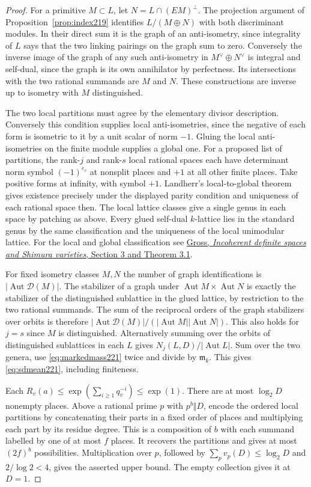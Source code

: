 \documentclass[a4paper,11pt]{article}
\theoremstyle{definition}
\theoremstyle{remark}
\numberwithin{equation}{section}
\newcommand{\Aut}{\operatorname{Aut}}
\begin{document}
\begin{proof}
For a primitive \(M\subset L\), let \(N=L\cap(EM)^\perp\).
The projection argument of Proposition~\ref{prop:index219}
identifies \(L/(M\oplus N)\) with both discriminant modules.
In their direct sum it is the graph of an anti-isometry, since
integrality of \(L\) says that the two linking pairings on
the graph sum to zero. Conversely the inverse image of the
graph of any such anti-isometry in \(M^\vee\oplus N^\vee\)
is integral and self-dual, since the graph is its own
annihilator by perfectness. Its intersections with the two
rational summands are \(M\) and \(N\). These constructions
are inverse up to isometry with \(M\) distinguished.

The two local partitions must agree by the elementary divisor
description. Conversely this condition supplies local
anti-isometries, since the negative of each form is
isometric to it by a unit scalar of norm \(-1\). Gluing the
local anti-isometries on the finite module supplies a global
one. For a proposed list of partitions, the rank-\(j\) and
rank-\(s\) local rational spaces each have determinant norm
symbol \((-1)^{e_v}\) at nonsplit places and \(+1\) at all
other finite places. Take positive forms at infinity, with
symbol \(+1\). Landherr's local-to-global theorem gives
existence precisely under the displayed parity condition
and uniqueness of each rational space then. The local
lattice classes give a single genus in each space by
patching as above. Every glued self-dual \(k\)-lattice lies
in the standard genus by the same classification and the
uniqueness of the local unimodular lattice. For the
local and global classification see
\href{https://people.math.harvard.edu/~gross/preprints/incoherent.pdf}
{Gross, \emph{Incoherent definite spaces and Shimura varieties},
Section 3 and Theorem 3.1}.

For fixed isometry classes \(M,N\) the number of graph
identifications is \(|\Aut\mathcal D(M)|\).
The stabilizer of a graph under \(\Aut M\times\Aut N\)
is exactly the stabilizer of the distinguished sublattice in
the glued lattice, by restriction to the two rational
summands. The sum of the reciprocal orders of the graph
stabilizers over orbits is therefore
\(|\Aut\mathcal D(M)|/(|\Aut M||\Aut N|)\).
This also holds for \(j=s\) since \(M\) is distinguished.
Alternatively summing over the orbits of distinguished
sublattices in each \(L\) gives \(N_j(L,D)/|\Aut L|\).
Sum over the two genera, use \eqref{eq:markedmass221}
twice and divide by \(\mathfrak m_k\). This gives
\eqref{eq:sdmean221}, including finiteness.

Each \(R_v(a)\le\exp(\sum_{i\ge1}q_v^{-i})\le\exp(1)\).
There are at most \(\log_2 D\) nonempty places. Above a
rational prime \(p\) with \(p^b\Vert D\), encode the ordered
local partitions by concatenating their parts in a fixed
order of places and multiplying each part by its residue
degree. This is a composition of \(b\) with each summand
labelled by one of at most \(f\) places. It recovers the
partitions and gives at most \((2f)^b\) possibilities.
Multiplication over \(p\), followed by
\(\sum_p v_p(D)\le\log_2 D\) and
\(2/\log 2<4\), gives the asserted upper bound. The empty
collection gives it at \(D=1\).
\end{proof}
\end{document}
